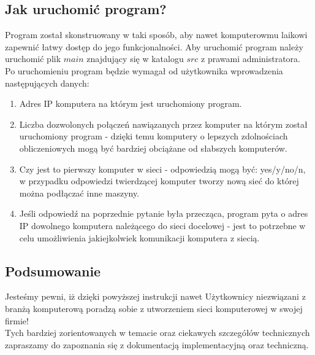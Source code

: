\subsection{Jak uruchomić program?}
Program został skonstruowany w taki sposób, aby nawet komputerowmu laikowi zapewnić łatwy dostęp do jego funkcjonalności. Aby uruchomić program należy uruchomić plik $main$ znajdujący się w katalogu $src$ z prawami administratora.\\
\indent Po uruchomieniu program będzie wymagał od użytkownika wprowadzenia następujących danych:
\begin{enumerate}
\item Adres IP komputera na którym jest uruchomiony program.
\item Liczba dozwolonych połączeń nawiązanych przez komputer na którym został uruchomiony program - dzięki temu komputery o lepszych zdolnościach obliczeniowych mogą być bardziej obciążane od słabszych komputerów.
\item Czy jest to pierwszy komputer w sieci - odpowiedzią mogą być: yes/y/no/n, w przypadku odpowiedzi twierdzącej komputer tworzy nową sieć do której można podłączać inne maszyny.
\item Jeśli odpowiedź na poprzednie pytanie była przecząca, program pyta o adres IP dowolnego komputera należącego do sieci docelowej - jest to potrzebne w celu umożliwienia jakiejkolwiek komunikacji komputera z siecią.
\end{enumerate}

\subsection{Podsumowanie}
Jesteśmy pewni, iż dzięki powyższej instrukcji nawet Użytkownicy niezwiązani z branżą komputerową poradzą sobie z utworzeniem sieci komputerowej w swojej firmie!\\
\indent Tych bardziej zorientowanych w temacie oraz ciekawych szczegółów technicznych zapraszamy do zapoznania się z dokumentacją implementacyjną oraz techniczną.